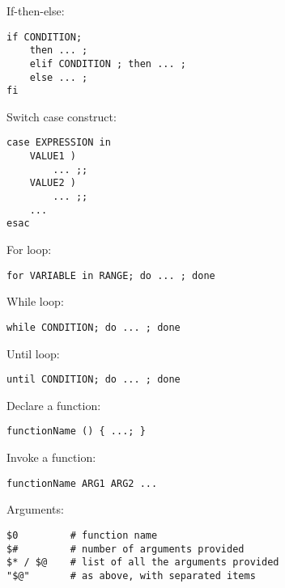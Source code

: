 \documentclass[twocolumn,8pt]{article}
\begin{document}

\begin{mdframed}[frametitle=Conditions]
If-then-else:
\begin{lstlisting}
if CONDITION; 
    then ... ; 
    elif CONDITION ; then ... ; 
    else ... ; 
fi
\end{lstlisting}

Switch case construct:
\begin{lstlisting}
case EXPRESSION in
    VALUE1 )
        ... ;;
    VALUE2 )
        ... ;;
    ...
esac
\end{lstlisting}

\end{mdframed}


\begin{mdframed}[frametitle=Loops]
For loop:
\begin{lstlisting}
for VARIABLE in RANGE; do ... ; done
\end{lstlisting}

While loop:
\begin{lstlisting}
while CONDITION; do ... ; done
\end{lstlisting}
Until loop:
\begin{lstlisting}
until CONDITION; do ... ; done
\end{lstlisting}

\end{mdframed}


\begin{mdframed}[frametitle=Functions]
Declare a function:
\begin{lstlisting}
functionName () { ...; }
\end{lstlisting}

Invoke a function:
\begin{lstlisting}
functionName ARG1 ARG2 ...
\end{lstlisting}

Arguments:
\begin{lstlisting}
$0         # function name
$#         # number of arguments provided
$* / $@    # list of all the arguments provided
"$@"       # as above, with separated items
\end{lstlisting}
\end{mdframed}
\end{document}

